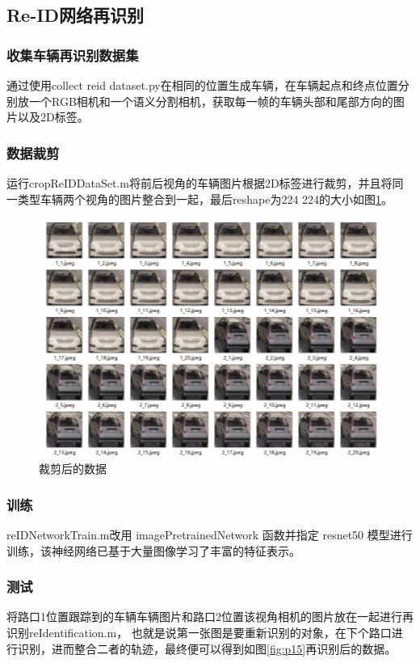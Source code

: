 \subsection{Re-ID网络再识别}
\subsubsection{收集车辆再识别数据集}
通过使用collect reid dataset.py在相同的位置生成车辆，在车辆起点和终点位置分别放一个RGB相机和一个语义分割相机，获取每一帧的车辆头部和尾部方向的图片以及2D标签。
\subsubsection{数据裁剪}
运行cropReIDDataSet.m将前后视角的车辆图片根据2D标签进行裁剪，并且将同一类型车辆两个视角的图片整合到一起，最后reshape为224 \times 224的大小如图\ref{fig:p14}。



\begin{figure}[htbp] %
	\centering
	\includegraphics[width=1\textwidth]{p14} %
	\caption{裁剪后的数据} %
	\label{fig:p14} %
\end{figure}




\subsubsection{训练}
reIDNetworkTrain.m改用 imagePretrainedNetwork 函数并指定 resnet50 模型进行训练，该神经网络已基于大量图像学习了丰富的特征表示。
\subsubsection{测试}
将路口1位置跟踪到的车辆车辆图片和路口2位置该视角相机的图片放在一起进行再识别reIdentification.m， 也就是说第一张图是要重新识别的对象，在下个路口进行识别，进而整合二者的轨迹，最终便可以得到如图\ref{fig:p15}再识别后的数据。







